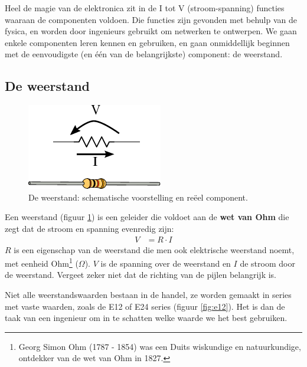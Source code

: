 \documentclass{article}
\begin{document}
		Heel de magie van de elektronica zit in de I tot V (stroom-spanning) functies waaraan de componenten voldoen. Die functies zijn gevonden met behulp van de fysica, en worden door ingenieurs gebruikt om netwerken te ontwerpen. We gaan enkele componenten leren kennen en gebruiken, en gaan onmiddellijk beginnen met de eenvoudigste (en één van de belangrijkste) component: de weerstand.


		\subsection{De weerstand}
			\begin{figure}[htbp]
				\centering
				\includegraphics{weerstand}
				\caption{De weerstand: schematische voorstelling en re\"eel component.}
				\label{fig:weerstand}
			\end{figure}
			 Een weerstand (figuur \ref{fig:weerstand}) is een geleider die voldoet aan de \textbf{wet van Ohm} die zegt dat de stroom en spanning evenredig zijn: 
			\begin{align}
				V &= R \cdot I
			\end{align} 
			$R$ is een eigenschap van de weerstand die men ook elektrische weerstand noemt, met eenheid Ohm\footnote{Georg Simon Ohm (1787 - 1854) was een Duits wiskundige en natuurkundige, ontdekker van de wet van Ohm in 1827.} ($\Omega$). $V$ is de spanning over de weerstand en $I$ de stroom door de weerstand. Vergeet zeker niet dat de richting van de pijlen belangrijk is.

			Niet alle weerstandswaarden bestaan in de handel, ze worden gemaakt in series met vaste waarden, zoals de E12 of E24 series (figuur \ref{fig:e12}). Het is dan de taak van een ingenieur om in te schatten welke waarde we het best gebruiken.
\end{document}
